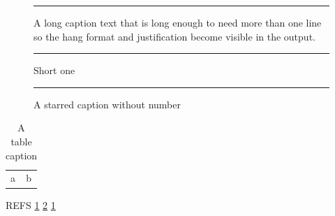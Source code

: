 \documentclass{article}
\begin{document}
\listoffigures
\listoftables
\begin{figure}[h]
\centering\rule{3cm}{1cm}
\caption[Short entry]{A long caption text that is long enough to need more than one line so the hang format and justification become visible in the output.}\label{fig:a}
\end{figure}
\begin{figure}[h]
\centering\rule{3cm}{1cm}
\caption{Short one}\label{fig:b}
\end{figure}
\begin{figure}[h]
\centering\rule{3cm}{1cm}
\caption*{A starred caption without number}
\end{figure}
\begin{table}[h]
\caption{A table caption}\label{tab:a}
\centering\begin{tabular}{ll}a&b\\\end{tabular}
\end{table}
REFS \ref{fig:a} \ref{fig:b} \ref{tab:a} \pageref{fig:a}
\end{document}
